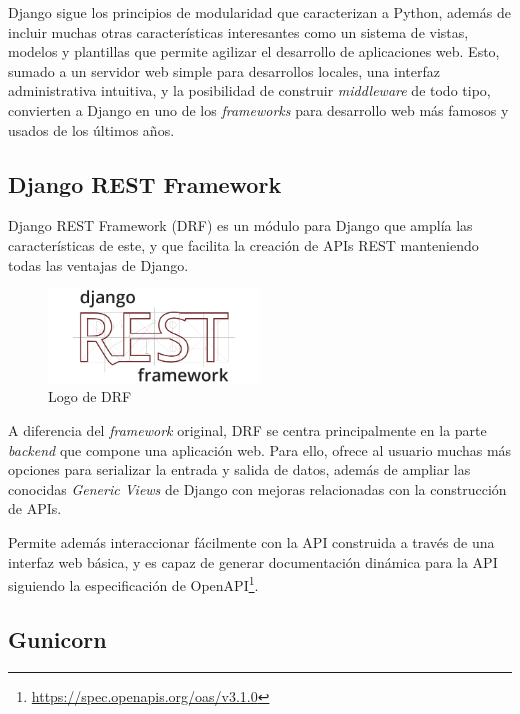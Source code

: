 Django sigue los principios de modularidad que caracterizan a Python, además de incluir muchas otras características interesantes como un sistema de vistas, modelos y plantillas que permite agilizar el desarrollo de aplicaciones web. Esto, sumado a un servidor web simple para desarrollos locales, una interfaz administrativa intuitiva, y la posibilidad de construir \emph{middleware} de todo tipo, convierten a Django en uno de los \emph{frameworks} para desarrollo web más famosos y usados de los últimos años. \emph{\parencite{Reference4}}

\subsection{Django REST Framework}\label{sec:drf}

Django REST Framework (DRF) es un módulo para Django que amplía las características de este, y que facilita la creación de APIs REST manteniendo todas las ventajas de Django. \emph{\parencite{Reference7}}

\begin{figure}[ht]
    \centering
    \includegraphics[width=0.5\textwidth]{Figures/drf-logo}
    \decoRule
    \caption[DRF (Logo)]{Logo de DRF \emph{\parencite{Reference8}}}
    \label{fig:drf-logo}
\end{figure}

A diferencia del \emph{framework} original, DRF se centra principalmente en la parte \emph{backend} que compone una aplicación web. Para ello, ofrece al usuario muchas más opciones para serializar la entrada y salida de datos, además de ampliar las conocidas \emph{Generic Views} de Django con mejoras relacionadas con la construcción de APIs. \emph{\parencite{Reference7}}

Permite además interaccionar fácilmente con la API construida a través de una interfaz web básica, y es capaz de generar documentación dinámica para la API siguiendo la especificación de OpenAPI\footnote{\url{https://spec.openapis.org/oas/v3.1.0}}. \emph{\parencite{Reference7}}

\subsection{Gunicorn}\label{sec:gunicorn}

